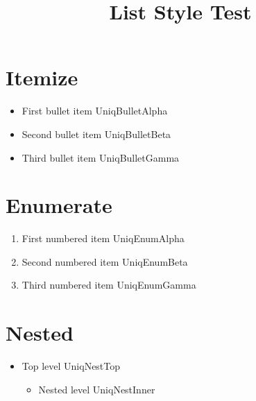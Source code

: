 \documentclass{SUSTechHomework}
\title{List Style Test}
\begin{document}
\maketitle

\section{Itemize}

\begin{itemize}
  \item First bullet item UniqBulletAlpha
  \item Second bullet item UniqBulletBeta
  \item Third bullet item UniqBulletGamma
\end{itemize}

\section{Enumerate}

\begin{enumerate}
  \item First numbered item UniqEnumAlpha
  \item Second numbered item UniqEnumBeta
  \item Third numbered item UniqEnumGamma
\end{enumerate}

\section{Nested}

\begin{itemize}
  \item Top level UniqNestTop
  \begin{itemize}
    \item Nested level UniqNestInner
  \end{itemize}
\end{itemize}
\end{document}
